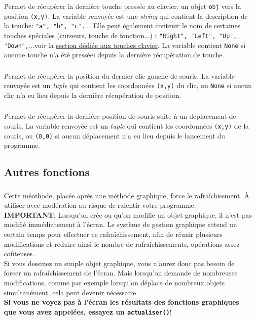 \documentclass[11pt,a4paper]{article}
\begin{document}
\subsubsection*{}
Permet de récupérer la dernière touche pressée au clavier. un objet {\tt obj} vers la position {\tt (x,y)}. La variable renvoyée est une {\it string} qui contient la description de la touche: {\tt "a", "b", "c",}... Elle peut également contenir le nom de certaines touches spéciales (curseurs, touche de fonction...) : {\tt "Right", "Left", "Up", "Down",}...voir la \underline{section dédiée aux touches clavier}. La variable contient {\tt None} si aucune touche n'a été presséei depuis la dernière récupération de touche.

\subsubsection*{}
Permet de récupérer la position du dernier clic gauche de souris. La variable renvoyée est un {\it tuple} qui contient les coordonnées {\tt (x,y)} du clic, ou {\tt None} si aucun clic n'a eu lieu depuis la dernière récupération de position.

\subsubsection*{}
Permet de récupérer la dernière position de souris suite à un déplacement de souris. La variable renvoyée est un {\it tuple} qui contient les coordonnées {\tt (x,y)} de la souris, ou {\tt (0,0)} si aucun déplacement n'a eu lieu depuis le lancement du programme.


\subsection*{Autres fonctions}

\subsubsection*{}
Cette méothode, placée après une méthode graphique, force le rafraîchissment. \`A utiliser avec modération au risque de ralentir votre programme.\\

{\bf IMPORTANT}: Lorsqu'on crée ou qu'on modifie un objet graphique, il n'est pas modifié immédiatement à l'écran. Le système de gestion graphique attend un certain temps pour effectuer ce rafraîchissement, afin de réunir plusieurs modifications et réduire ainsi le nombre de rafraîchissements, opérations assez coûteuses.\\
Si vous dessinez un simple objet graphique, vous n'aurez donc pas besoin de forcer un rafraîchissement de l'écran. Mais lorsqu'on demande de nombreuses modifications, comme par exemple lorsqu'on déplace de nombreux objets simultanément, cela peut devenir nécessaire.\\
{\bf Si vous ne voyez pas à l'écran les résultats des fonctions graphiques que vous avez appelées, essayez un {\tt actualiser()}!}
\end{document}
